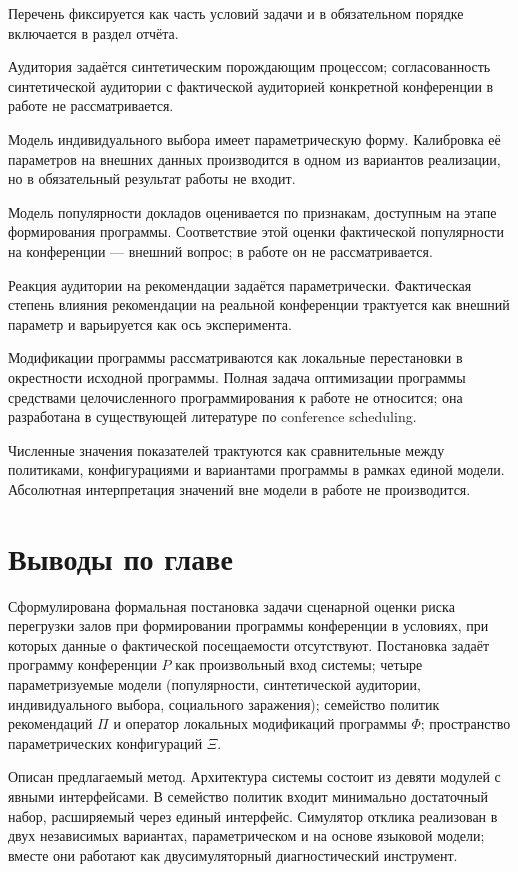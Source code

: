 Перечень фиксируется как часть условий задачи и в обязательном порядке включается в раздел отчёта.

Аудитория задаётся синтетическим порождающим процессом; согласованность синтетической аудитории с фактической аудиторией конкретной конференции в работе не рассматривается.

Модель индивидуального выбора имеет параметрическую форму. Калибровка её параметров на внешних данных производится в одном из вариантов реализации, но в обязательный результат работы не входит.

Модель популярности докладов оценивается по признакам, доступным на этапе формирования программы. Соответствие этой оценки фактической популярности на конференции --- внешний вопрос; в работе он не рассматривается.

Реакция аудитории на рекомендации задаётся параметрически. Фактическая степень влияния рекомендации на реальной конференции трактуется как внешний параметр и варьируется как ось эксперимента.

Модификации программы рассматриваются как локальные перестановки в окрестности исходной программы. Полная задача оптимизации программы средствами целочисленного программирования к работе не относится; она разработана в существующей литературе по conference scheduling.

Численные значения показателей трактуются как сравнительные между политиками, конфигурациями и вариантами программы в рамках единой модели. Абсолютная интерпретация значений вне модели в работе не производится.


\section{Выводы по главе}

Сформулирована формальная постановка задачи сценарной оценки риска перегрузки залов при формировании программы конференции в условиях, при которых данные о фактической посещаемости отсутствуют. Постановка задаёт программу конференции $P$ как произвольный вход системы; четыре параметризуемые модели (популярности, синтетической аудитории, индивидуального выбора, социального заражения); семейство политик рекомендаций $\Pi$ и оператор локальных модификаций программы $\Phi$; пространство параметрических конфигураций $\Xi$.

Описан предлагаемый метод. Архитектура системы состоит из девяти модулей с явными интерфейсами. В семейство политик входит минимально достаточный набор, расширяемый через единый интерфейс. Симулятор отклика реализован в двух независимых вариантах, параметрическом и на основе языковой модели; вместе они работают как двусимуляторный диагностический инструмент.

